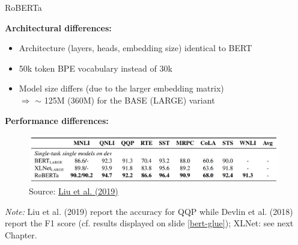 \documentclass[]{beamer}
\begin{document}
\begin{frame}{RoBERTa \href{https://arxiv.org/pdf/1907.11692.pdf}{}}

\textbf{Architectural differences:}

\begin{itemize}
\item Architecture (layers, heads, embedding size) identical to BERT
\item 50k token BPE vocabulary instead of 30k
\item Model size differs (due to the larger embedding matrix)\\
			$\Rightarrow$ $\sim$ 125M (360M) for the BASE (LARGE) variant 
\end{itemize}

\textbf{Performance differences:}

\begin{figure}
\centering
\includegraphics[width = 11cm]{figure/roberta-sota.png}\\ 
\footnotesize{Source:} \href{https://arxiv.org/pdf/1907.11692.pdf}{\footnotesize Liu et al. (2019)}
\end{figure}
\footnotesize
\textit{Note:} Liu et al. (2019) report the accuracy for QQP while Devlin et al. (2018) report the F1 score (cf. results displayed on slide \ref{bert-glue}); XLNet: see next Chapter.
\end{frame}
\end{document}
